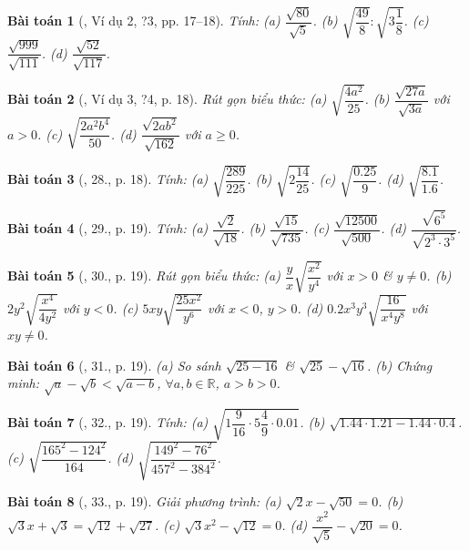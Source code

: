 \documentclass{article}
\newtheorem{baitoan}{Bài toán}
\begin{document}
\begin{baitoan}[\cite{SGK_Toan_9_tap_1}, Ví dụ 2, ?3, pp. 17--18]
	Tính: (a) $\dfrac{\sqrt{80}}{\sqrt{5}}$. (b) $\sqrt{\dfrac{49}{8}}:\sqrt{3\dfrac{1}{8}}$. (c) $\dfrac{\sqrt{999}}{\sqrt{111}}$. (d) $\dfrac{\sqrt{52}}{\sqrt{117}}$.
\end{baitoan}

\begin{baitoan}[\cite{SGK_Toan_9_tap_1}, Ví dụ 3, ?4, p. 18]
	Rút gọn biểu thức: (a) $\sqrt{\dfrac{4a^2}{25}}$. (b) $\dfrac{\sqrt{27a}}{\sqrt{3a}}$ với $a > 0$. (c) $\sqrt{\dfrac{2a^2b^4}{50}}$. (d) $\dfrac{\sqrt{2ab^2}}{\sqrt{162}}$ với $a\ge0$.
\end{baitoan}

\begin{baitoan}[\cite{SGK_Toan_9_tap_1}, 28., p. 18]
	Tính: (a) $\sqrt{\dfrac{289}{225}}$. (b) $\sqrt{2\dfrac{14}{25}}$. (c) $\sqrt{\dfrac{0.25}{9}}$. (d) $\sqrt{\dfrac{8.1}{1.6}}$.
\end{baitoan}

\begin{baitoan}[\cite{SGK_Toan_9_tap_1}, 29., p. 19]
	Tính: (a) $\dfrac{\sqrt{2}}{\sqrt{18}}$. (b) $\dfrac{\sqrt{15}}{\sqrt{735}}$. (c) $\dfrac{\sqrt{12500}}{\sqrt{500}}$. (d) $\dfrac{\sqrt{6^5}}{\sqrt{2^3\cdot3^5}}$.
\end{baitoan}

\begin{baitoan}[\cite{SGK_Toan_9_tap_1}, 30., p. 19]
	Rút gọn biểu thức: (a) $\dfrac{y}{x}\sqrt{\dfrac{x^2}{y^4}}$ với $x > 0$ \& $y\ne0$. (b) $2y^2\sqrt{\dfrac{x^4}{4y^2}}$ với $y < 0$. (c) $5xy\sqrt{\dfrac{25x^2}{y^6}}$ với $x < 0$, $y > 0$. (d) $0.2x^3y^3\sqrt{\dfrac{16}{x^4y^8}}$ với $xy\ne0$.
\end{baitoan}

\begin{baitoan}[\cite{SGK_Toan_9_tap_1}, 31., p. 19]
	(a) So sánh $\sqrt{25 - 16}$ \& $\sqrt{25} - \sqrt{16}$. (b) Chứng minh: $\sqrt{a} - \sqrt{b} < \sqrt{a - b}$, $\forall a,b\in\mathbb{R}$, $a > b > 0$.
\end{baitoan}

\begin{baitoan}[\cite{SGK_Toan_9_tap_1}, 32., p. 19]
	Tính: (a) $\sqrt{1\dfrac{9}{16}\cdot5\dfrac{4}{9}\cdot0.01}$. (b) $\sqrt{1.44\cdot1.21 - 1.44\cdot0.4}$. (c) $\sqrt{\dfrac{165^2 - 124^2}{164}}$. (d) $\sqrt{\dfrac{149^2 - 76^2}{457^2 - 384^2}}$.
\end{baitoan}

\begin{baitoan}[\cite{SGK_Toan_9_tap_1}, 33., p. 19]
	Giải phương trình: (a)  $\sqrt{2}x - \sqrt{50} = 0$. (b) $\sqrt{3}x + \sqrt{3} = \sqrt{12} + \sqrt{27}$. (c) $\sqrt{3}x^2 - \sqrt{12} = 0$. (d) $\dfrac{x^2}{\sqrt{5}} - \sqrt{20} = 0$.
\end{baitoan}
\end{document}
